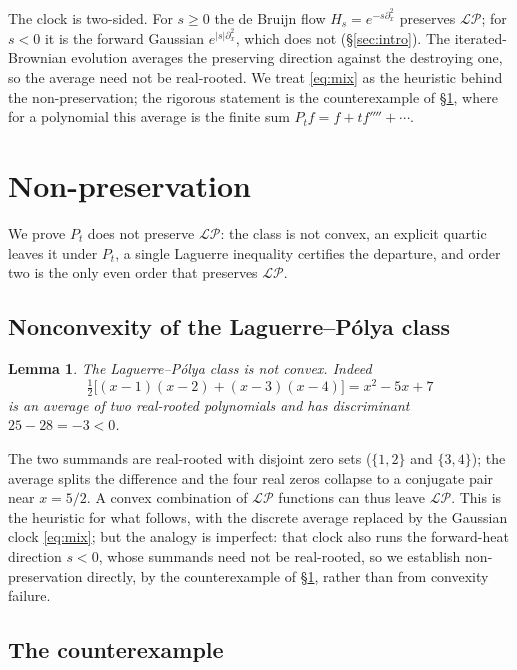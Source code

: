\documentclass[11pt,reqno]{amsart}
\theoremstyle{plain}
\newtheorem{lemma}[theorem]{Lemma}
\theoremstyle{definition}
\theoremstyle{remark}
\newcommand{\LP}{\mathcal{LP}}
\begin{document}
The clock is two-sided. For $s\ge0$ the de Bruijn flow
$H_s=e^{-s\partial_x^2}$ preserves $\LP$; for $s<0$ it is the forward Gaussian
$e^{|s|\partial_x^2}$, which does not (\S\ref{sec:intro}). The iterated-Brownian
evolution averages the preserving direction against the destroying one, so the
average need not be real-rooted. We treat \eqref{eq:mix} as the heuristic behind
the non-preservation; the rigorous statement is the counterexample of
\S\ref{sec:nonpres}, where for a polynomial this average is the finite sum
$P_tf=f+tf''''+\cdots$.

\section{Non-preservation}\label{sec:nonpres}

We prove $P_t$ does not preserve $\LP$: the class is not convex, an explicit
quartic leaves it under $P_t$, a single Laguerre inequality certifies the
departure, and order two is the only even order that preserves $\LP$.

\subsection{Nonconvexity of the Laguerre--P\'olya class}

\begin{lemma}\label{lem:mixture}
The Laguerre--P\'olya class is not convex. Indeed
\[
   \tfrac12\bigl[(x-1)(x-2)+(x-3)(x-4)\bigr]=x^2-5x+7
\]
is an average of two real-rooted polynomials and has discriminant
$25-28=-3<0$.
\end{lemma}

The two summands are real-rooted with disjoint zero sets ($\{1,2\}$ and
$\{3,4\}$); the average splits the difference and the four real zeros collapse
to a conjugate pair near $x=5/2$. A convex combination of $\LP$ functions can
thus leave $\LP$. This is the heuristic for what follows, with the discrete
average replaced by the Gaussian clock \eqref{eq:mix}; but the analogy is
imperfect: that clock also runs the forward-heat direction $s<0$, whose
summands need not be real-rooted, so we establish non-preservation directly,
by the counterexample of \S\ref{sec:nonpres}, rather than from convexity failure.

\subsection{The counterexample}
\end{document}
